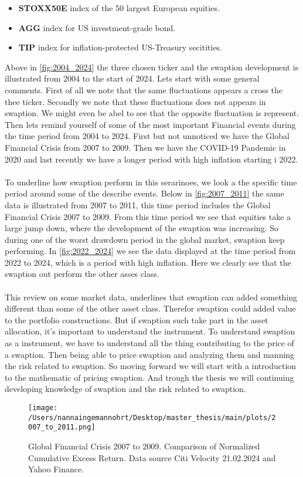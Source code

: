\begin{itemize}
    \item \textbf{STOXX50E} \text{---}  index of the 50 largest European equities.
    \item \textbf{AGG} \text{---}  index for US investment-grade bond. 
    \item \textbf{TIP} \text{---}  index for inflation-protected US-Treasury secitities.
    \end{itemize}
\noindent
Above in \autoref{fig:2004_2024} the three chosen ticker and the swaption development
is illustrated from 2004 to the start of 2024. Lets start with some general comments.
First of all we note that the same fluctuations appears a cross the thee ticker. 
Secondly we note that these fluctuations does not appears in swaption. 
We might even be abel to see that the opposite fluctuation is represent. 
Then lets remind yourself of some of the most important Financial events during 
the time period from 2004 to 2024. First but not unnoticed we have the Global Financial Crisis
from 2007 to 2009.  Then we have the COVID-19 Pandemic in 2020 and last recently we have a 
longer period with high inflation starting i 2022. 
\\\\
To underline how swaption perform in this serarinoes, we look a the specific time period
around some of the describe events. Below in \autoref{fig:2007_2011} the same data is illustrated
from 2007 to 2011, this time period includes the Global Financial Crisis 2007 to 2009. 
From this time period we see that equities take a large jump down, where the development of the 
swaption was increasing. So during one of the worst drawdown period in the global market, 
swaption keep performing. In \autoref{fig:2022_2024} we see the data displayed at the 
time period from 2022 to 2024, which is a period with high inflation. 
Here we clearly see that the swaption out perform the other asses class. 
\\\\
This review on some market data, underlines that swaption can added something different than some 
of the other asset class. Therefor swaption could added value to the portfolio constructions. 
But if swaption such take part in the asset allocation, it's important to understand the instrument.
To understand swaption as a instrument, we have to understand all the thing contributing to the price
of a swaption. Then being able to price swaption and analyzing them and manning the risk related to 
swaption.  So moving forward we will start with a introduction to the mathematic of pricing swaption. 
And trough the thesis we will continuing  developing knowledge of swaption and the risk related to swaption.
\begin{figure}[H]
    \centering
    \texttt{[image: /Users/nannaingemannohrt/Desktop/master\_thesis/main/plots/2007\_to\_2011.png]}
    \caption{Global Financial Crisis 2007 to 2009.  Comparison of Normalized Cumulative Excess Return. Data source Citi Velocity 21.02.2024 
    and Yahoo Finance.}
    \label{fig:2007_2011}
\end{figure}
\noindent

